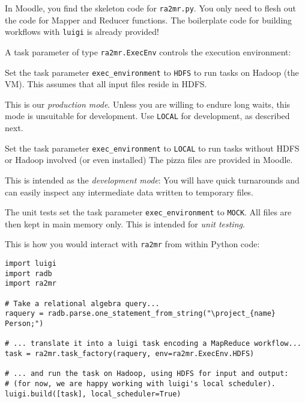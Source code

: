 \documentclass[12pt]{exam}
\begin{document}
\begin{questions}
\begin{itemize}
\end{itemize}


In Moodle, you find the skeleton code for \verb!ra2mr.py!. You only need to flesh out the code for Mapper and Reducer functions. The boilerplate code for building workflows with \verb!luigi! is already provided!

A task parameter of type \verb!ra2mr.ExecEnv! controls the execution environment:

\begin{compactitem}

    \item Set the task parameter \verb!exec_environment! to \verb!HDFS! to run tasks on Hadoop (the VM). This assumes that all input files reside in HDFS.
    
    This is our {\em production mode}\/. Unless you are willing to endure long waits, this mode is unsuitable for development. Use \verb!LOCAL! for development, as described next.
    
    \item Set the task parameter \verb!exec_environment! to \verb!LOCAL! to run tasks without HDFS or Hadoop involved (or even installed)
    The pizza files are provided in Moodle.
    
    This is intended as the {\em development mode}: You will have quick turnarounds and can easily inspect any intermediate data written to temporary files.
    
    \item The unit tests set the task parameter \verb!exec_environment! to \verb!MOCK!. All files are then kept in main memory only.
    This is intended for {\em unit testing}.
    
\end{compactitem}




This is how you would interact with \verb!ra2mr! from within Python code:

\begin{Verbatim}[frame=single, fontsize=\small]
import luigi
import radb
import ra2mr

# Take a relational algebra query...
raquery = radb.parse.one_statement_from_string("\project_{name} Person;")

# ... translate it into a luigi task encoding a MapReduce workflow...
task = ra2mr.task_factory(raquery, env=ra2mr.ExecEnv.HDFS)

# ... and run the task on Hadoop, using HDFS for input and output:
# (for now, we are happy working with luigi's local scheduler).
luigi.build([task], local_scheduler=True)


\end{Verbatim}
\end{questions}
\end{document}
